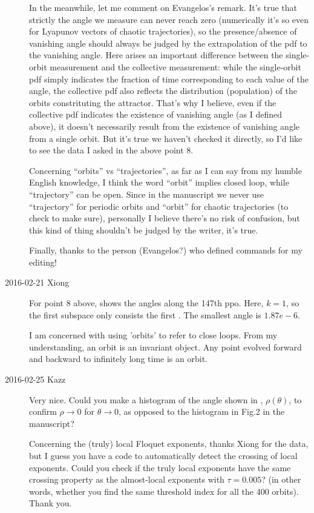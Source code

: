 \begin{description}
In the meanwhile, let me comment on Evangelos's remark. It's true that strictly the angle we measure can never reach zero (numerically it's so even for Lyapunov vectors of chaotic trajectories), so the presence/absence of vanishing angle should always be judged by the extrapolation of the pdf to the vanishing angle. Here arises an important difference between the single-orbit measurement and the collective measurement: while the single-orbit pdf simply indicates the fraction of time corresponding to each value of the angle, the collective pdf also reflects the distribution (population) of the orbits constrituting the attractor. That's why I believe, even if the collective pdf indicates the existence of vanishing angle (as I defined above), it doesn't necessarily result from the existence of vanishing angle from a single orbit. But it's true we haven't checked it directly, so I'd like to see the data I asked in the above point 8.

Concerning ``orbits'' vs ``trajectories'', as far as I can say from my humble English knowledge, I think the word ``orbit'' implies closed loop, while ``trajectory'' can be open. Since in the manuscript we never use ``trajectory'' for periodic orbits and ``orbit'' for chaotic trajectories (to check to make sure), personally I believe there's no risk of confusion, but this kind of thing shouldn't be judged by the writer, it's true.

Finally, thanks to the person (Evangelos?) who defined commands for my editing!

\item[2016-02-21 Xiong]
For point 8 above,  shows the angles along the 147th ppo.
Here, $k=1$, so the first subspace only consists the first \Fv. The smallest angle
is $1.87e-6$.

I am concerned with using 'orbits' to refer to close loops. From my understanding,
an orbit is an invariant object. Any point evolved forward and backward to infinitely
long time is an orbit.

\item[2016-02-25 Kazz]
Very nice. Could you make a histogram of the angle shown in
, $\rho(\theta)$, to confirm $\rho \to 0$ for
$\theta \to 0$, as opposed to the histogram in Fig.2 in the manuscript?

Concerning the (truly) local Floquet exponents, thanks Xiong for the data, but I guess you have a code to automatically detect the crossing of local exponents. Could you check if the truly local exponents have the same crossing property as the almost-local exponents with $\tau=0.005$? (in other words, whether you find the same threshold index for all the 400 orbits). Thank you.


\end{description}
